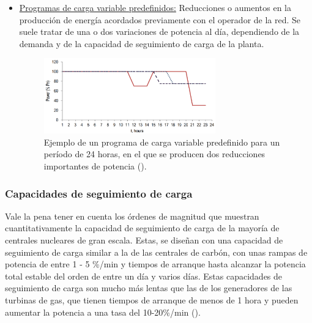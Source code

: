 \begin{itemize}
  \item \underline{Programas de carga variable predefinidos:} Reducciones o aumentos en la producción de energía acordados previamente con el operador de la red. Se suele tratar de una o dos variaciones de potencia al día, dependiendo de la demanda y de la capacidad de seguimiento de carga de la planta.
  
  \begin{figure}[h]
    \centering
    \includegraphics[width=0.7\textwidth]{content/figures/predefined_load_following.png}
    \caption{Ejemplo de un programa de carga variable predefinido para un período de 24 horas, en el que se producen dos reducciones importantes de potencia (\cite{NEA_2011_load_following}).}
    \label{fig:predefined_load_following}
    \vspace{-0.5cm}
  \end{figure}
\end{itemize}

\subsubsection{Capacidades de seguimiento de carga}

Vale la pena tener en cuenta los órdenes de magnitud que muestran cuantitativamente la capacidad de seguimiento de carga de la mayoría de centrales nucleares de gran escala. Estas, se diseñan con una capacidad de seguimiento de carga similar a la de las centrales de carbón, con unas rampas de potencia de entre 1 - 5 \%/min y tiempos de arranque hasta alcanzar la potencia total estable del orden de entre un día y varios días. Estas capacidades de seguimiento de carga son mucho más lentas que las de los generadores de las turbinas de gas, que tienen tiempos de arranque de menos de 1 hora y pueden aumentar la potencia a una tasa del 10-20\%/min (\cite{stanford_load_following}).


